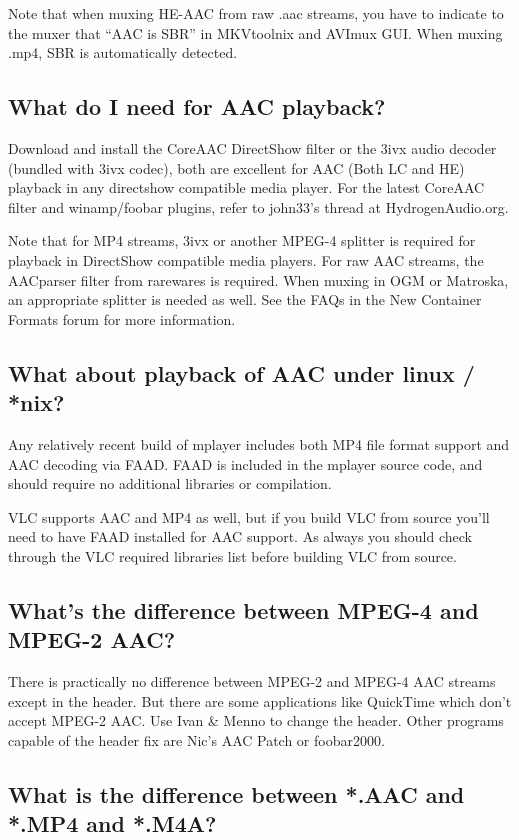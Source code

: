 ﻿\documentclass[12pt]{article}
\begin{document}
Note that when muxing HE-AAC from raw .aac streams, you have to indicate to the muxer that ``AAC is
SBR'' in MKVtoolnix and AVImux GUI. When muxing .mp4, SBR is automatically detected.

\subsection{What do I need for AAC playback?}

Download and install the CoreAAC DirectShow filter or the 3ivx audio decoder (bundled with 3ivx
codec), both are excellent for AAC (Both LC and HE) playback in any directshow compatible media
player. For the latest CoreAAC filter and winamp/foobar plugins, refer to john33's thread at
HydrogenAudio.org.

Note that for MP4 streams, 3ivx or another MPEG-4 splitter is required for playback in DirectShow
compatible media players. For raw AAC streams, the AACparser filter from rarewares is required. When
muxing in OGM or Matroska, an appropriate splitter is needed as well. See the FAQs in the New
Container Formats forum for more information.

\subsection{What about playback of AAC under linux / *nix?}

Any relatively recent build of mplayer includes both MP4 file format support and AAC decoding via
FAAD. FAAD is included in the mplayer source code, and should require no additional libraries or
compilation.

VLC supports AAC and MP4 as well, but if you build VLC from source you'll need to have FAAD
installed for AAC support. As always you should check through the VLC required libraries list before
building VLC from source.

\subsection{What's the difference between MPEG-4 and MPEG-2 AAC?}

There is practically no difference between MPEG-2 and MPEG-4 AAC streams except in the header. But
there are some applications like QuickTime which don't accept MPEG-2 AAC. Use Ivan \& Menno to change
the header. Other programs capable of the header fix are Nic's AAC Patch or foobar2000.

\subsection{What is the difference between *.AAC and *.MP4 and *.M4A?}
\end{document}
